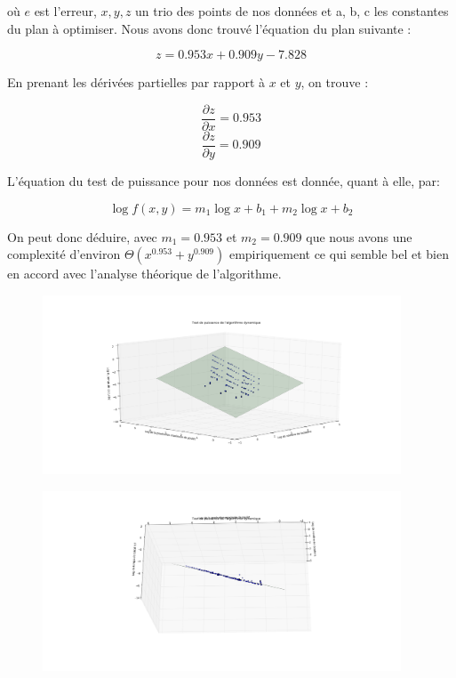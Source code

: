 \documentclass[a4paper, 12pt]{article} %
\begin{document}
    où $e$ est l'erreur, $x, y, z$ un trio des points de nos données et a, b, c les constantes du plan
    à optimiser. Nous avons donc trouvé l'équation du plan suivante :

    \begin{equation}
        z = 0.953x + 0.909y - 7.828
    \end{equation}

    En prenant les dérivées partielles par rapport à $x$ et $y$, on trouve : 

    \begin{equation}
        \frac{\partial z}{\partial x} = 0.953
    \end{equation}
    \begin{equation}
        \frac{\partial z}{\partial y} = 0.909
    \end{equation}

    L'équation du test de puissance pour nos données est donnée, quant à elle, par:

    \begin{equation}
        \log f(x,y) = m_{1}\log x + b_{1} + m_{2}\log x + b_{2}
    \end{equation}

    On peut donc déduire, avec $m_{1} = 0.953$ et $m_{2} = 0.909$ que nous avons une complexité
    d'environ $\Theta(x^{0.953} + y^{0.909})$ empiriquement ce qui semble bel et bien en accord 
    avec l'analyse théorique de l'algorithme.

    \begin{figure}
    	\centering
        \includegraphics[width=0.95\textwidth]{Figure/AlgorithmeDynamique.png}
    \end{figure}

    \begin{figure}
    	\centering
        \includegraphics[width=0.95\textwidth]{Figure/AlgorithmeDynamique2.png}
    \end{figure}


\end{document}
